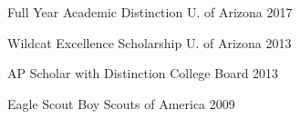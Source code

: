 \vspace{-0.5cm}

\begin{multicols}{2}
\begin{cvhonors}
  \cvhonor
    {Full Year Academic Distinction} %
    {U. of Arizona} %
    {} %
    {2017} %

  \cvhonor
    {Wildcat Excellence Scholarship} %
    {U. of Arizona} %
    {} %
    {2013} %

%
%
\end{cvhonors}

\begin{cvhonors}
%
%
  \cvhonor
    {AP Scholar with Distinction} %
    {College Board} %
    {} %
    {2013} %

  \cvhonor
    {Eagle Scout} %
    {Boy Scouts of America} %
    {} %
    {2009} %

\end{cvhonors}
\end{multicols}
\vspace{-0.5cm}
